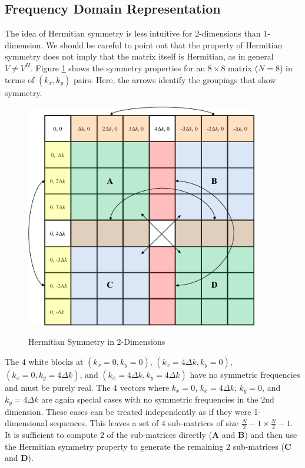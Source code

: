 \subsection{Frequency Domain Representation}
The idea of Hermitian symmetry is less intuitive for 2-dimensions than 1-dimension. We should be careful to point out that the property of Hermitian symmetry does not imply that the matrix itself is Hermitian, as in general $V \neq V^H$. Figure \ref{os_fig:7dd} shows the symmetry properties for an $8 \times 8$ matrix ($N = 8$) in terms of $(k_x, k_y)$ pairs. Here, the arrows identify the groupings that show symmetry. 
\begin{figure}[H]
  \begin{center}
\includegraphics[width=4in]{../media/Ocean_Surface/2-d_hermitian_symmetry.png}
  \end{center}
  \renewcommand{\baselinestretch}{1} \small\normalsize
  \begin{quote}
    \caption[Hermitian Symmetry in 2-Dimensions]{Hermitian Symmetry in 2-Dimensions \label{os_fig:7dd}}
  \end{quote}
\end{figure}
\renewcommand{\baselinestretch}{2} \small\normalsize
The $4$ white blocks at $(k_x=0, k_y=0)$, $(k_x=4\Delta k, k_y=0)$, $(k_x=0, k_y=4\Delta k)$, and $(k_x=4\Delta k, k_y=4\Delta k)$ have no symmetric frequencies and must be purely real. The 4 vectors where $k_x = 0$, $k_x = 4\Delta k$, $k_y = 0$, and $k_y = 4\Delta k$ are again special cases with no symmetric frequencies in the 2nd dimension. These cases can be treated independently as if they were 1-dimensional sequences. This leaves a set of $4$ sub-matrices of size $\frac{N}{2} - 1 \times \frac{N}{2} - 1$. It is sufficient to compute $2$ of the sub-matrices directly ($\mathbf{A}$ and $\mathbf{B}$) and then use the Hermitian symmetry property to generate the remaining $2$ sub-matrices ($\mathbf{C}$ and $\mathbf{D}$).

